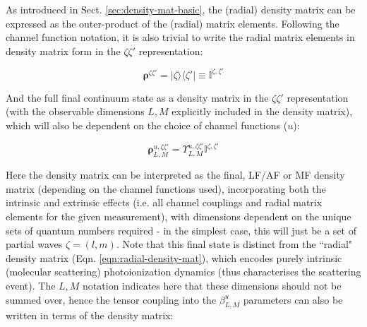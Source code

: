 \documentclass[10pt]{article}
\begin{document}



As introduced in Sect. \ref{sec:density-mat-basic}, the (radial) density matrix can be expressed as the outer-product of the (radial) matrix elements. Following the channel function notation, it is also trivial to write the radial matrix elements in density matrix form in the $\zeta\zeta'$ representation:

\begin{equation}
\mathbf{\rho}^{\zeta\zeta'} = |\zeta\rangle\langle\zeta'| \equiv \mathbb{I}^{\zeta,\zeta'}
\end{equation}

And the full final continuum state as a density matrix in the $\zeta\zeta'$ representation (with the observable dimensions $L,M$ explicitly included in the density matrix), which will also be dependent on the choice of channel functions ($u$):

\begin{equation}
\mathbf{\rho}_{L,M}^{u,\zeta\zeta'}=\varUpsilon_{L,M}^{u,\zeta\zeta'}\mathbb{I}^{\zeta,\zeta'}
\end{equation}

Here the density matrix can be interpreted as the final, LF/AF or
MF density matrix (depending on the channel functions used), incorporating both the intrinsic and extrinsic
effects (i.e. all channel couplings and radial matrix elements for
the given measurement), with dimensions dependent on the unique sets of quantum numbers required - in the simplest case, this will just be a set of partial waves $\zeta = (l,m)$. Note that this final state is distinct from the ``radial" density matrix (Eqn. \ref{eqn:radial-density-mat}), which encodes purely intrinsic (molecular scattering) photoionization dynamics (thus characterises the scattering event). The $L,M$ notation indicates here that these dimensions should not be summed over, hence the tensor coupling into the $\beta_{L,M}^{u}$ parameters can also be written in terms of the density matrix:
\end{document}
